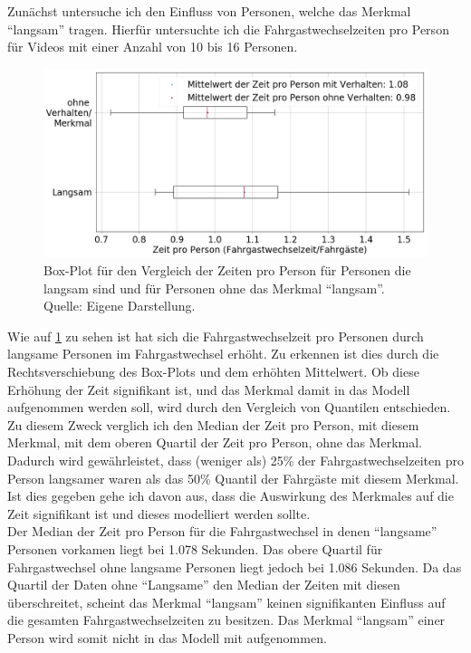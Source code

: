 Zunächst untersuche ich den Einfluss von Personen, welche das Merkmal "`langsam"' tragen. Hierfür untersuchte ich die Fahrgastwechselzeiten pro Person für Videos mit einer Anzahl von 10 bis 16 Personen.
\begin{figure}[H]
	\centering
		\includegraphics[height=0.3\textwidth]{pictures/data_evaluation/behavior/comp_Langsam.png}
	\caption{Box-Plot für den Vergleich der Zeiten pro Person für Personen die langsam sind und für Personen ohne das Merkmal "`langsam"'. Quelle: Eigene Darstellung.}
	\label{fig:BoxPlotLangsam}
\end{figure}
Wie auf \figurename \ref{fig:BoxPlotLangsam} zu sehen ist hat sich die Fahrgastwechselzeit pro Personen durch langsame Personen im Fahrgastwechsel erhöht. Zu erkennen ist dies durch die Rechtsverschiebung des Box-Plots und dem erhöhten Mittelwert. Ob diese Erhöhung der Zeit signifikant ist, und das Merkmal damit in das Modell aufgenommen werden soll, wird durch den Vergleich von Quantilen entschieden. Zu diesem Zweck verglich ich den Median der Zeit pro Person, mit diesem Merkmal, mit dem oberen Quartil der Zeit pro Person, ohne das Merkmal. Dadurch wird gewährleistet, dass (weniger als) 25\% der Fahrgastwechselzeiten pro Person langsamer waren als das 50\% Quantil der Fahrgäste mit diesem Merkmal. Ist dies gegeben gehe ich davon aus, dass die Auswirkung des Merkmales auf die Zeit signifikant ist und dieses modelliert werden sollte.\\
Der Median der Zeit pro Person für die Fahrgastwechsel in denen "`langsame"' Personen vorkamen liegt bei 1.078 Sekunden. Das obere Quartil für Fahrgastwechsel ohne langsame Personen liegt jedoch bei 1.086 Sekunden. Da das Quartil der Daten ohne "`Langsame"' den Median der Zeiten mit diesen überschreitet, scheint das Merkmal "`langsam"' keinen signifikanten Einfluss auf die gesamten Fahrgastwechselzeiten zu besitzen. Das Merkmal "`langsam"' einer Person wird somit nicht in das Modell mit aufgenommen.

